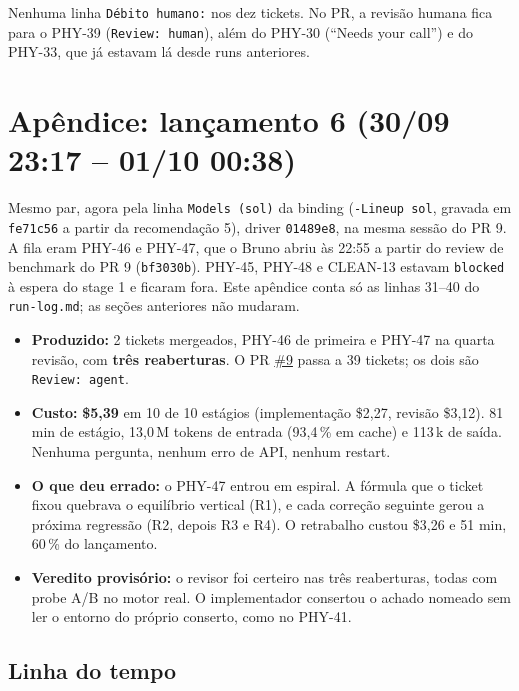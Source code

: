 \documentclass[11pt,a4paper]{article}
\begin{document}
Nenhuma linha \texttt{Débito humano:} nos dez tickets. No PR, a revisão
humana fica para o PHY-39 (\texttt{Review: human}), além do PHY-30 (``Needs
your call'') e do PHY-33, que já estavam lá desde runs anteriores.

\appendix
\section{Apêndice: lançamento 6 (30/09 23:17 -- 01/10 00:38)}

Mesmo par, agora pela linha \texttt{Models (sol)} da binding
(\texttt{-Lineup sol}, gravada em \texttt{fe71c56} a partir da recomendação 5),
driver \texttt{01489e8}, na mesma sessão do PR 9. A fila eram PHY-46 e PHY-47,
que o Bruno abriu às 22:55 a partir do review de benchmark do PR 9
(\texttt{bf3030b}). PHY-45, PHY-48 e CLEAN-13 estavam \texttt{blocked} à espera
do stage 1 e ficaram fora. Este apêndice conta só as linhas 31--40 do
\texttt{run-log.md}; as seções anteriores não mudaram.

\begin{itemize}
  \item \textbf{Produzido:} 2 tickets mergeados, PHY-46 de primeira e PHY-47 na
        quarta revisão, com \textbf{três reaberturas}. O PR
        \href{https://github.com/Laginho/PhysiSyst/pull/9}{\#9} passa a 39
        tickets; os dois são \texttt{Review: agent}.
  \item \textbf{Custo:} \textbf{\$5,39} em 10 de 10 estágios (implementação
        \$2,27, revisão \$3,12). 81 min de estágio, 13,0\,M tokens de entrada
        (93,4\,\% em cache) e 113\,k de saída. Nenhuma pergunta, nenhum erro
        de API, nenhum restart.
  \item \textbf{O que deu errado:} o PHY-47 entrou em espiral. A fórmula que o
        ticket fixou quebrava o equilíbrio vertical (R1), e cada correção
        seguinte gerou a próxima regressão (R2, depois R3 e R4). O retrabalho
        custou \$3,26 e 51 min, 60\,\% do lançamento.
  \item \textbf{Veredito provisório:} o revisor foi certeiro nas três
        reaberturas, todas com probe A/B no motor real. O implementador
        consertou o achado nomeado sem ler o entorno do próprio conserto, como
        no PHY-41.
\end{itemize}

\subsection{Linha do tempo}
\end{document}
